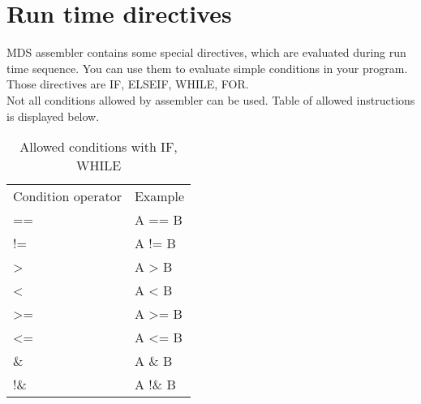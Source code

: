         \section{Run time directives}
        MDS assembler contains some special directives, which are evaluated during run time sequence. You can use them to evaluate simple conditions in your program.
        Those directives are IF, ELSEIF, WHILE, FOR.\\ Not all conditions allowed by assembler can be used.
        Table of allowed instructions is displayed below.
            \begin{table}[h!]
                    \mysmallfont{}
                    \centering{}
                    \begin{tabular}{|l|l}
                    \hline
                    Condition operator       &          Example  \\
                    ==                       &          A ==  B  \\
                    !=                       &          A !=  B  \\
                    >                        &          A >   B  \\
                    <                        &          A <   B  \\
                    >=                       &          A >=  B  \\
                    <=                       &          A <=  B  \\
                    \&                       &          A \&  B  \\
                    !\&                      &          A !\& B
                    \end{tabular}
                    \caption{Allowed conditions with IF, WHILE}
            \end{table}

